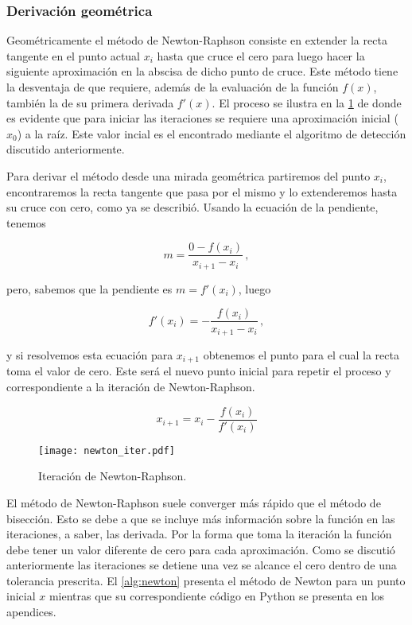 \subsubsection*{Derivación geométrica}
Geométricamente el método de Newton-Raphson consiste en extender la recta tangente en el punto actual $x_i$ hasta que cruce el cero para luego hacer la siguiente aproximación  en la abscisa de dicho punto de cruce. Este método tiene la desventaja de que 
requiere, además de la evaluación de la función $f(x)$, también la de su primera derivada $f'(x)$. El proceso se ilustra en la \cref{fig:newton} de donde es evidente que para iniciar las iteraciones se requiere una aproximación inicial ($x_0$) a la raíz. Este valor incial es el encontrado mediante el algoritmo de detección discutido anteriormente.



Para derivar el método desde una mirada geométrica partiremos del punto $x_i$, encontraremos la recta tangente que pasa por el mismo y lo extenderemos hasta su cruce con cero, como ya se describió. Usando la ecuación de la pendiente, tenemos

\[m = \frac{0 - f(x_i)}{x_{i+1} - x_i}\, ,\]

pero, sabemos que la pendiente es $m = f'(x_i)$, luego

\[f'(x_i) = -\frac{f(x_i)}{x_{i + 1} - x_i}\, ,\]

y si resolvemos esta ecuación para $x_{i +1}$ obtenemos el punto para el cual la recta toma el valor de cero. Este será el nuevo punto inicial para repetir el proceso y correspondiente a la iteración de Newton-Raphson.

\begin{equation}
  x_{i + 1} = x_i - \frac{f(x_i)}{f'(x_i)}
  \label{eq:iteracion_newton}
\end{equation}


\begin{figure}[H]
\centering
\texttt{[image: newton\_iter.pdf]}
\caption{Iteración de Newton-Raphson.}
\label{fig:newton}
\end{figure}


El método de Newton-Raphson suele converger más rápido que el método de bisección. Esto se debe a que se incluye más información sobre la función en las iteraciones, a saber, las derivada. Por la forma que toma la iteración la función debe tener un valor diferente de cero para cada aproximación. Como se discutió anteriormente las iteraciones se detiene una vez se alcance el cero dentro de una tolerancia prescrita. El \cref{alg:newton} presenta el método de Newton para un punto inicial $x$ mientras que su correspondiente código en Python se presenta en los apendices.

